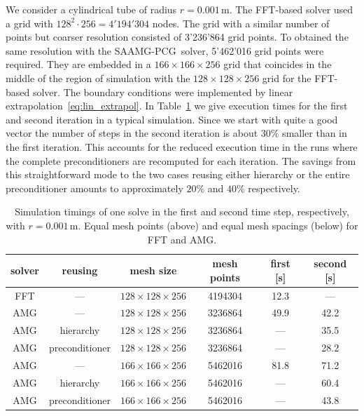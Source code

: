 \documentclass[a4paper,10pt,3p,preprint,pdftex]{elsarticle}
\newcommand{\oursolver}{\textsc{SAAMG-PCG}}
\begin{document}
We consider a cylindrical tube of radius $r=0.001$\,m.  The FFT-based
solver used a grid with $128^2\cdot256=4'194'304$ nodes.  The grid with
a similar number of points but coarser resolution consisted of 3'236'864
grid points.  To obtained the same resolution with the \oursolver\
solver, 5'462'016 grid points were required.  They are embedded in a
$166\times166\times256$ grid that coincides in the middle of the region
of simulation with the $128\times128\times256$ grid for the FFT-based
solver.  The boundary conditions were implemented by linear
extrapolation~\eqref{eq:lin_extrapol}.  In
Table~\ref{tbl:timings_variations_overview} we give execution times for
the first and second iteration in a typical simulation.  Since we start
with quite a good vector the number of steps in the second iteration is
about 30\% smaller than in the first iteration.  This accounts for the
reduced execution time in the runs where the complete preconditioners
are recomputed for each iteration.  The savings from this
straightforward mode to the two cases reusing either hierarchy or the
entire preconditioner amounts to approximately $20\%$ and $40\%$
respectively.

\begin{table}[ht]
  \begin{center}
    \begin{tabular}{cccccc}
    \hline
        solver & reusing & mesh size & mesh points & first [s] & second [s] \\
        \hline
        FFT & --- & $128\times128\times256$ & 4194304 & 12.3 & --- \\
        \hline
        AMG & --- & $128\times128\times256$ & 3236864 & 49.9 & 42.2 \\
        AMG & hierarchy & $128\times128\times256$ & 3236864 & --- & 35.5 \\
        AMG & preconditioner & $128\times128\times256$ & 3236864 & --- & 28.2 \\
        \hline
        AMG & --- & $166\times166\times256$ & 5462016 & 81.8 & 71.2 \\
        AMG & hierarchy & $166\times166\times256$ & 5462016 & --- & 60.4 \\
        AMG & preconditioner & $166\times166\times256$ & 5462016 & --- & 43.8 \\
        \hline
  \end{tabular}
  \caption{Simulation timings of one solve in the first and second time
    step, respectively, with $r=0.001$\,m.  Equal mesh points (above)
    and equal mesh spacings (below) for FFT and AMG.}
  \label{tbl:timings_variations_overview} \end{center}
\end{table}
\end{document}
